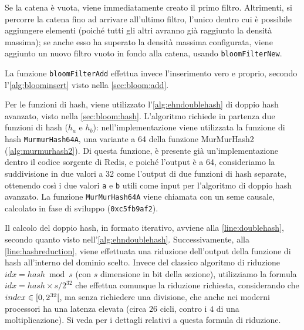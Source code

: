 

Se la catena è vuota, viene immediatamente creato il primo filtro. Altrimenti, si percorre la catena
fino ad arrivare all'ultimo filtro, l'unico dentro cui è possibile aggiungere elementi (poiché tutti
gli altri avranno già raggiunto la densità massima); se anche esso ha superato la densità massima 
configurata, viene aggiunto un nuovo filtro vuoto in fondo alla catena, usando \verb|bloomFilterNew|.



La funzione \verb|bloomFilterAdd| effettua invece l'inserimento vero e proprio, secondo
l'\autoref{alg:bloominsert} visto nella \autoref{sec:bloom:add}.

Per le funzioni di hash, viene utilizzato l'\autoref{alg:ehndoublehash} di doppio hash
avanzato, visto nella \autoref{sec:bloom:hash}. L'algoritmo richiede in partenza due funzioni di
hash ($h_a$ e $h_b$): nell'implementazione viene utilizzata la funzione di hash
\verb|MurmurHash64A|, una variante a \SI{64}{\bit} della funzione MurMurHash2
(\autoref{alg:murmurhash2}). Di questa funzione, è presente già un'implementazione dentro il
codice sorgente di Redis, e poiché l'output è a \SI{64}{\bit}, consideriamo la suddivisione in due
valori a \SI{32}{\bit} come l'output di due funzioni di hash separate, ottenendo così i due valori
\verb|a| e \verb|b| utili come input per l'algoritmo di doppio hash avanzato. La funzione
\verb|MurMurHash64A| viene chiamata con un seme causale, calcolato in fase di sviluppo
(\verb|0xc5fb9af2|).

Il calcolo del doppio hash, in formato iterativo, avviene alla \autoref{line:doublehash}, secondo
quanto visto nell'\autoref{alg:ehndoublehash}. Successivamente, alla
\autoref{line:hashreduction}, viene effettuata una riduzione dell'output della funzione di hash
all'interno del dominio scelto. Invece del classico algoritmo di riduzione $idx = hash \bmod s$ (con
$s$ dimensione in bit della sezione), utilizziamo la formula $idx = hash \times s / 2^{32}$ che
effettua comunque la riduzione richiesta, considerando che $index \in \interval[open
right]{0}{2^{32}}$, ma senza richiedere una divisione, che anche nei moderni processori ha una latenza
elevata (circa $26$ cicli, contro i $4$ di una moltiplicazione). Si veda \cite{lemirereduction} per
i dettagli relativi a questa formula di riduzione.

